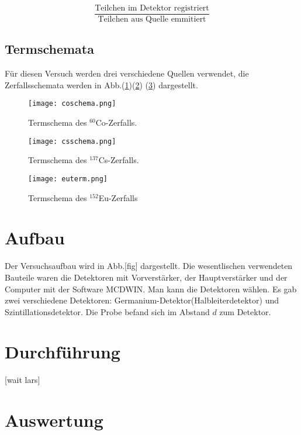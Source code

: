 \documentclass[ngerman,11pt]{article}
\begin{document}
\begin{multicols}{2}
		\[
		\frac{\text{Teilchen im Detektor registriert}}{\text{Teilchen aus Quelle emmitiert}}
		\]

		\subsection{Termschemata}
		F\"ur diesen Versuch werden drei verschiedene Quellen verwendet, die Zerfallsschemata werden in Abb.(\ref{fig:coterm})(\ref{fig:csterm}) (\ref{fig:euterm}) dargestellt.
		\begin{figure}[H]
			\centering
			\texttt{[image: coschema.png]}
			\caption{Termschema des $^{60}$Co-Zerfalls. \protect\footnotemark[1]}
			\label{fig:coterm}
		\end{figure}
		\begin{figure}[H]
			\centering
			\texttt{[image: csschema.png]}
			\caption{Termschema des $^{137}$Cs-Zerfalls. \protect\footnotemark[2]}
			\label{fig:csterm}
		\end{figure}

		\begin{figure}[H]
			\centering
			\texttt{[image: euterm.png]}
			\caption{Termschema des $^{152}$Eu-Zerfalls\cite{kern}}
			\label{fig:euterm}
		\end{figure}

		\section{Aufbau}
		Der Versuchsaufbau wird in Abb.[fig] dargestellt. Die wesentlischen verwendeten Bauteile waren die Detektoren mit Vorverst\"arker, der Hauptverst\"arker und der Computer mit der Software MCDWIN. Man kann die Detektoren w\"ahlen. Es gab zwei verschiedene Detektoren: Germanium-Detektor(Halbleiterdetektor) und Szintillationsdetektor. Die Probe befand sich im Abstand $d$ zum Detektor.
		\section{Durchf\"uhrung}
		[wait lars]
		\section{Auswertung}

\end{multicols}
\end{document}
